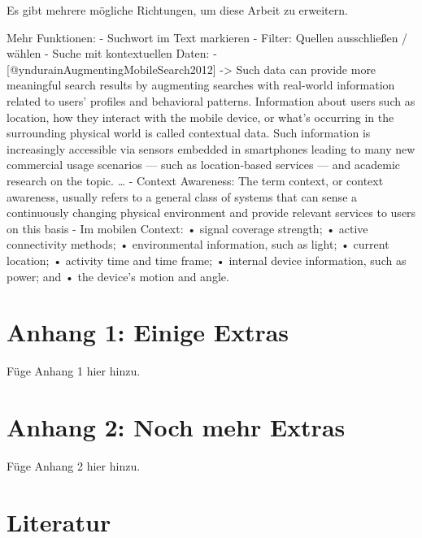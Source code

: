 \documentclass[
  12pt,
  a4paperpaper,
]{report}
\begin{document}
Es gibt mehrere mögliche Richtungen, um diese Arbeit zu erweitern.

Mehr Funktionen: - Suchwort im Text markieren - Filter: Quellen
ausschließen / wählen - Suche mit kontextuellen Daten: -
{[}@yndurainAugmentingMobileSearch2012{]} -\textgreater{} Such data can
provide more meaningful search results by augmenting searches with
real-world information related to users' profiles and behavioral
patterns. Information about users such as location, how they interact
with the mobile device, or what's occurring in the surrounding physical
world is called contextual data. Such information is increasingly
accessible via sensors embedded in smartphones leading to many new
commercial usage scenarios --- such as location-based services --- and
academic research on the topic. \ldots{} - Context Awareness: The term
context, or context awareness, usually refers to a general class of
systems that can sense a continuously changing physical environment and
provide relevant services to users on this basis - Im mobilen Context: •
signal coverage strength; • active connectivity methods; • environmental
information, such as light; • current location; • activity time and time
frame; • internal device information, such as power; and • the device's
motion and angle.

\chapter*{Anhang 1: Einige Extras}\label{anhang-1-einige-extras}

Füge Anhang 1 hier hinzu.

\chapter*{Anhang 2: Noch mehr Extras}\label{anhang-2-noch-mehr-extras}

Füge Anhang 2 hier hinzu.

\footnotesize

\chapter{Literatur}\label{literatur}
\end{document}
